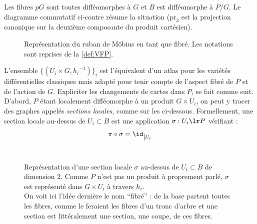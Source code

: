 \begin{definition}
\begin{adjustbox}{valign=C,raise=1cm, minipage={1.1\linewidth}}
		Les fibres $pG$ sont toutes difféomorphes à $G$ et $B$ est difféomorphe à $P/G$. Le diagramme commutatif ci-contre résume la situation ($\text{pr}_2$ est la projection canonique sur la deuxième composante du produit cartésien).
	\end{adjustbox}
\end{definition}
\skipl
\begin{figure}[h]
	
	\caption[\DONE Ruban de Möbius comme variété fibrée]{Représentation du ruban de Möbius en tant que fibré. Les notations sont reprises de la \cref{def:VFP}.}
	\label{fig:ruban2modius}
\end{figure}

L'ensemble $\big\{(U_i\times G, {h_i}^{-1})\big\}_i$ est l'équivalent d'un atlas pour les variétés différentielles classiques mais adapté pour tenir compte de l'aspect fibré de $P$ et de l'action de $G$. Expliciter les changements de cartes dans $P$, se fait comme suit.
\\
D'abord, $P$ étant localement difféomorphe à un produit $G\times U_i$, on peut y tracer des graphes appelés \emph{sections locales}, comme sur les  ci-dessous. Formellement, une section locale au-dessus  de $U_i \subset B$ est une application $\sigma : U_i \lr P$ vérifiant :
\[\pi\circ \sigma = \id_{{\displaystyle |}U_i}\]
\\

\begin{figure}[h]
	
	\caption[\DONE Représentation d'une section local]
	{Représentation d'une section locale $\sigma$ au-dessus de $U_i\subset B$ de dimension 2. 
		Comme $P$ n'est pas un produit à proprement parlé, $\sigma$ est représenté dans $G\times U_i$ à travers $h_i$. \\
		On voit ici l'idée dernière le nom ``fibré'' : de la base partent toutes les fibres, comme le feraient les fibres d'un tronc d'arbre et une section est littéralement une section, une coupe, de ces fibres.}
	\label{fig:section_local}
\end{figure}
\skipl

